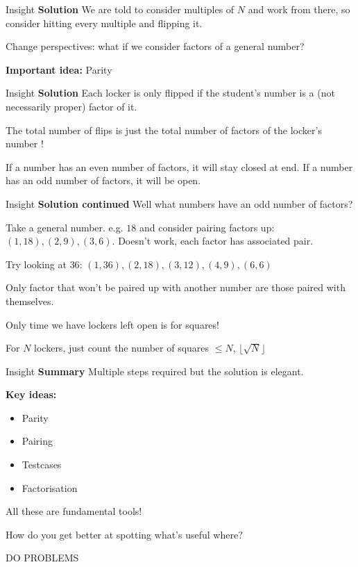 \documentclass{beamer}
\begin{document}
\begin{frame}{Insight}
    \textbf{Solution}
        We are told to consider multiples of $N$ and work from there, so consider hitting every multiple and flipping it.

        Change perspectives: what if we consider factors of a general number? 

        \textbf{Important idea:} Parity
    \vspace{0.5em}
\end{frame}

\begin{frame}{Insight}
    \textbf{Solution}
        Each locker is only flipped if the student's number is a (not necessarily proper) factor of it. 
        
        The total number of flips is just the total number of factors of the locker's number !

        If a number has an even number of factors, it will stay closed at end. If a number has an odd number of factors, it will be open.
    \vspace{0.5em}
\end{frame}

\begin{frame}{Insight}
    \textbf{Solution continued }
        Well what numbers have an odd number of factors? 
        
        Take a general number. e.g. $18$ and consider pairing factors up: $(1, 18), (2, 9), (3, 6)$. Doesn't work, each factor has associated pair. 
        
        Try looking at $36$: $(1, 36), (2, 18),  (3, 12), (4, 9), (6, 6)$

        Only factor that won't be paired up with another number are those paired with themselves.

        Only time we have lockers left open is for squares!

        For $N$ lockers, just count the number of squares $\leq N$, $\lfloor \sqrt{N} \rfloor$
    \vspace{0.5em}
\end{frame}

\begin{frame}{Insight}
    \textbf{Summary }
        Multiple steps required but the solution is elegant.

        \textbf{Key ideas:}
        \begin{itemize}
            \item Parity
            \item Pairing
            \item Testcases
            \item Factorisation
        \end{itemize}

        All these are fundamental tools!

        How do you get better at spotting what's useful where?

        DO PROBLEMS
    \vspace{0.5em}
\end{frame}
\end{document}
